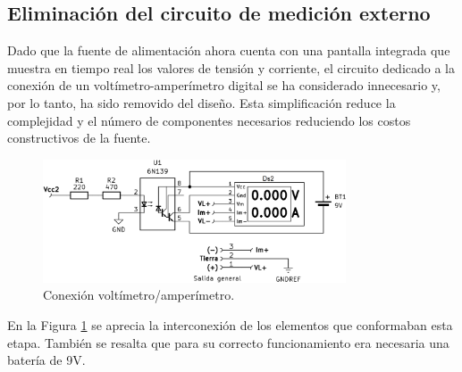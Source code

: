 \subsection{Eliminación del circuito de medición externo}
Dado que la fuente de alimentación ahora cuenta con una pantalla integrada que muestra en tiempo real los valores de tensión y corriente, el circuito dedicado a la conexión de un voltímetro-amperímetro digital se ha considerado innecesario y, por lo tanto, ha sido removido del diseño. Esta simplificación reduce la complejidad y el número de componentes necesarios reduciendo los costos constructivos de la fuente.\par
\begin{figure}[H]
    \centering
    \includegraphics[width=0.8\textwidth]{./imagenes/voltimetro_amperimetro.png}
    \caption{Conexión voltímetro/amperímetro.}
    \label{F:voltimetro_amperimetro}
\end{figure}
En la Figura \ref{F:voltimetro_amperimetro} se aprecia la interconexión de los elementos que conformaban esta etapa. También se resalta que para su correcto funcionamiento era necesaria una batería de 9V.\par


